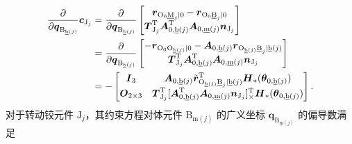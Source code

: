 \begin{align*}\frac{\partial}{\partial \boldsymbol{q}_{\text{B}_{\underline{\text{b}}(j)}}} \boldsymbol{c}_{\text{J}_j}
    &= \frac{\partial}{\partial \boldsymbol{q}_{\text{B}_{\underline{\text{b}}(j)}}} \begin{bmatrix} \boldsymbol{r}_{\text{O}_0\underline{\text{M}}_j|0} - \boldsymbol{r}_{\text{O}_0\underline{\text{B}}_j|0} \\ \boldsymbol{T}_{\text{J}_j}^\text{T} \boldsymbol{A}_{0,\underline{\text{b}}(j)}^\text{T} \boldsymbol{A}_{0,\underline{\text{m}}(j)} \boldsymbol{n}_{\text{J}_j} \end{bmatrix} \notag \\
    &= \frac{\partial}{\partial \boldsymbol{q}_{\text{B}_{\underline{\text{b}}(j)}}} \begin{bmatrix} -\boldsymbol{r}_{\text{O}_0\text{O}_{\underline{\text{b}}(j)}|0} - \boldsymbol{A}_{0,\underline{\text{b}}(j)} \boldsymbol{r}_{\text{O}_{\underline{\text{b}}(j)}\underline{\text{B}}_j|\underline{\text{b}}(j)} \\ \boldsymbol{T}_{\text{J}_j}^\text{T} \boldsymbol{A}_{0,\underline{\text{b}}(j)}^\text{T} \boldsymbol{A}_{0,\underline{\text{m}}(j)} \boldsymbol{n}_{\text{J}_j} \end{bmatrix} \notag \\
    &= -\begin{bmatrix} \boldsymbol{I}_3 & \boldsymbol{A}_{0,\underline{\text{b}}(j)} \tilde{\boldsymbol{r}}_{\text{O}_{\underline{\text{b}}(j)}\underline{\text{B}}_j|\underline{\text{b}}(j)}^\text{T} \boldsymbol{H}_*(\boldsymbol{\theta}_{0,\underline{\text{b}}(j)}) \\ \boldsymbol{O}_{2\times 3} & \boldsymbol{T}_{\text{J}_j}^\text{T} [\boldsymbol{A}_{0,\underline{\text{b}}(j)}^\text{T} \boldsymbol{A}_{0,\underline{\text{m}}(j)} \boldsymbol{n}_{\text{J}_j}]_\times^\text{T} \boldsymbol{H}_*(\boldsymbol{\theta}_{0,\underline{\text{b}}(j)}) \end{bmatrix}.\end{align*}
对于转动铰元件 $\text{J}_j$，其约束方程对体元件 $\text{B}_{\underline{\text{m}}(j)}$ 的广义坐标 $\boldsymbol{q}_{\text{B}_{\underline{\text{m}}(j)}}$ 的偏导数满足
